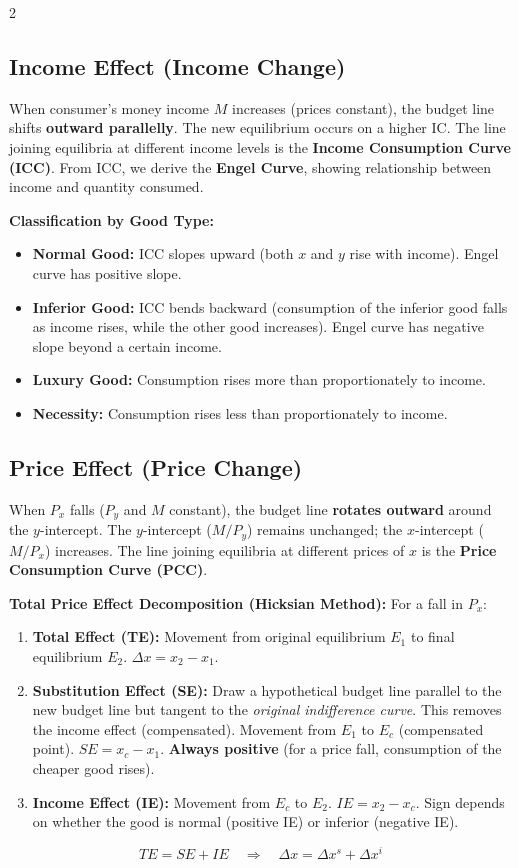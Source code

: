 \documentclass[10pt,a4paper]{article}
\begin{document}
\begin{multicols}{2}
\subsection*{Income Effect (Income Change)}
When consumer's money income $M$ increases (prices constant), the budget line shifts \textbf{outward parallelly}. The new equilibrium occurs on a higher IC. The line joining equilibria at different income levels is the \textbf{Income Consumption Curve (ICC)}. From ICC, we derive the \textbf{Engel Curve}, showing relationship between income and quantity consumed.

\textbf{Classification by Good Type:}
\begin{itemize}[leftmargin=*,nosep]
    \item \textbf{Normal Good:} ICC slopes upward (both $x$ and $y$ rise with income). Engel curve has positive slope.
    \item \textbf{Inferior Good:} ICC bends backward (consumption of the inferior good falls as income rises, while the other good increases). Engel curve has negative slope beyond a certain income.
    \item \textbf{Luxury Good:} Consumption rises more than proportionately to income.
    \item \textbf{Necessity:} Consumption rises less than proportionately to income.
\end{itemize}

\subsection*{Price Effect (Price Change)}
When $P_x$ falls ($P_y$ and $M$ constant), the budget line \textbf{rotates outward} around the $y$-intercept. The $y$-intercept ($M/P_y$) remains unchanged; the $x$-intercept ($M/P_x$) increases. The line joining equilibria at different prices of $x$ is the \textbf{Price Consumption Curve (PCC)}.

\textbf{Total Price Effect Decomposition (Hicksian Method):}
For a fall in $P_x$:
\begin{enumerate}[leftmargin=*,nosep]
    \item \textbf{Total Effect (TE):} Movement from original equilibrium $E_1$ to final equilibrium $E_2$. $\Delta x = x_2 - x_1$.
    \item \textbf{Substitution Effect (SE):} Draw a hypothetical budget line parallel to the new budget line but tangent to the \textit{original indifference curve}. This removes the income effect (compensated). Movement from $E_1$ to $E_c$ (compensated point). $SE = x_c - x_1$. \textbf{Always positive} (for a price fall, consumption of the cheaper good rises).
    \item \textbf{Income Effect (IE):} Movement from $E_c$ to $E_2$. $IE = x_2 - x_c$. Sign depends on whether the good is normal (positive IE) or inferior (negative IE).
\end{enumerate}
\[
TE = SE + IE \quad \Rightarrow \quad \Delta x = \Delta x^s + \Delta x^i
\]


\end{multicols}
\end{document}
